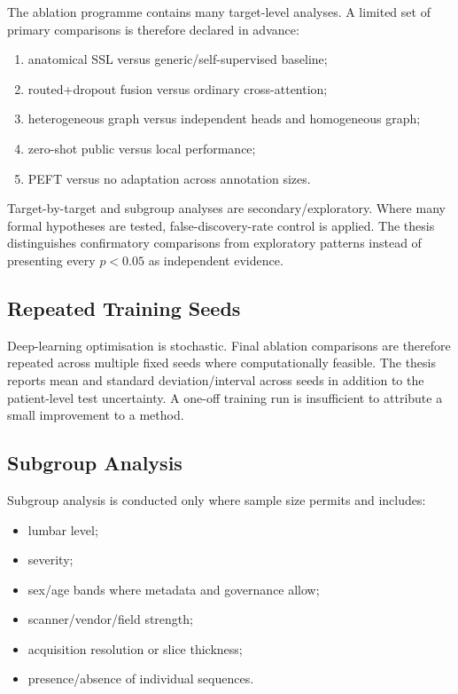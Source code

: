 The ablation programme contains many target-level analyses. A limited set of
primary comparisons is therefore declared in advance:

\begin{enumerate}
  \item anatomical SSL versus generic/self-supervised baseline;
  \item routed+dropout fusion versus ordinary cross-attention;
  \item heterogeneous graph versus independent heads and homogeneous graph;
  \item zero-shot public versus local performance;
  \item PEFT versus no adaptation across annotation sizes.
\end{enumerate}

Target-by-target and subgroup analyses are secondary/exploratory. Where many
formal hypotheses are tested, false-discovery-rate control is applied. The
thesis distinguishes confirmatory comparisons from exploratory patterns instead
of presenting every $p<0.05$ as independent evidence.

\subsection{Repeated Training Seeds}
\label{sec:method-seeds}

Deep-learning optimisation is stochastic. Final ablation comparisons are
therefore repeated across multiple fixed seeds where computationally feasible.
The thesis reports mean and standard deviation/interval across seeds in addition
to the patient-level test uncertainty. A one-off training run is insufficient
to attribute a small improvement to a method.

\subsection{Subgroup Analysis}
\label{sec:method-subgroups}

Subgroup analysis is conducted only where sample size permits and includes:

\begin{itemize}
  \item lumbar level;
  \item severity;
  \item sex/age bands where metadata and governance allow;
  \item scanner/vendor/field strength;
  \item acquisition resolution or slice thickness;
  \item presence/absence of individual sequences.
\end{itemize}

